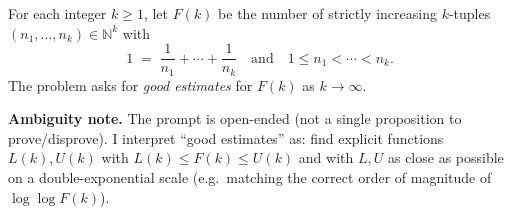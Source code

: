 For each integer $k\ge 1$, let $F(k)$ be the number of strictly increasing $k$-tuples
$(n_1,\dots,n_k)\in \mathbb{N}^k$ with
\[
1 \;=\; \frac{1}{n_1}+\cdots+\frac{1}{n_k}
\quad\text{and}\quad 1\le n_1<\cdots<n_k.
\]
The problem asks for \emph{good estimates} for $F(k)$ as $k\to\infty$.

\medskip
\noindent\textbf{Ambiguity note.} The prompt is open-ended (not a single proposition to prove/disprove).
I interpret ``good estimates'' as: find explicit functions $L(k),U(k)$ with
$L(k)\le F(k)\le U(k)$ and with $L,U$ as close as possible on a double-exponential scale
(e.g.\ matching the correct order of magnitude of $\log\log F(k)$).
